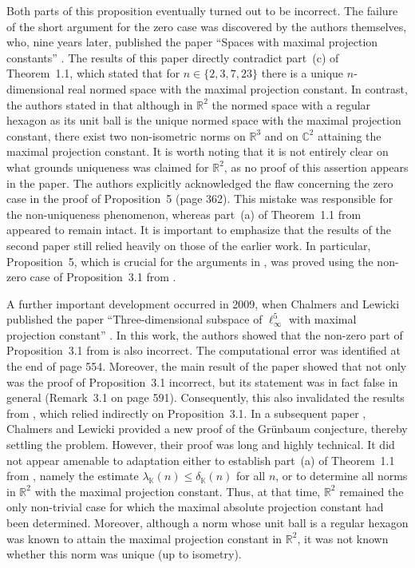 \documentclass[12pt, reqno]{amsart}
\theoremstyle{definition}
\theoremstyle{remark}
\numberwithin{equation}{section}
\begin{document}
Both parts of this proposition eventually turned out to be incorrect. The failure of the short argument for the zero case was discovered by the authors themselves, who, nine years later, published the paper ``Spaces with maximal projection constants'' \cite{konigtomczak2}. The results of this paper directly contradict part~(c) of Theorem~1.1, which stated that for $n \in \{2, 3, 7, 23\}$ there is a unique $n$-dimensional real normed space with the maximal projection constant. In contrast, the authors stated in \cite{konigtomczak2} that although in $\mathbb{R}^2$ the normed space with a regular hexagon as its unit ball is the unique normed space with the maximal projection constant, there exist two non-isometric norms on $\mathbb{R}^3$ and on $\mathbb{C}^2$ attaining the maximal projection constant. It is worth noting that it is not entirely clear on what grounds uniqueness was claimed for $\mathbb{R}^2$, as no proof of this assertion appears in the paper. The authors explicitly acknowledged the flaw concerning the zero case in the proof of Proposition~5 (page 362). This mistake was responsible for the non-uniqueness phenomenon, whereas part~(a) of Theorem~1.1 from \cite{konigtomczak} appeared to remain intact. It is important to emphasize that the results of the second paper \cite{konigtomczak2} still relied heavily on those of the earlier work. In particular, Proposition~5, which is crucial for the arguments in \cite{konigtomczak2}, was proved using the non-zero case of Proposition~3.1 from \cite{konigtomczak}.

A further important development occurred in 2009, when Chalmers and Lewicki published the paper ``Three-dimensional subspace of $\ell_{\infty}^5$ with maximal projection constant'' \cite{chalmerslewicki}. In this work, the authors showed that the non-zero part of Proposition~3.1 from \cite{konigtomczak} is also incorrect. The computational error was identified at the end of page 554. Moreover, the main result of the paper showed that not only was the proof of Proposition~3.1 incorrect, but its statement was in fact false in general (Remark~3.1 on page 591). Consequently, this also invalidated the results from \cite{konigtomczak2}, which relied indirectly on Proposition~3.1. In a subsequent paper \cite{chalmerslewicki2}, Chalmers and Lewicki provided a new proof of the Gr\"unbaum conjecture, thereby settling the problem. However, their proof was long and highly technical. It did not appear amenable to adaptation either to establish part~(a) of Theorem~1.1 from \cite{konigtomczak}, namely the estimate $\lambda_{\mathbb{K}}(n)\leq \delta_{\mathbb{K}}(n)$ for all $n$, or to determine all norms in $\mathbb{R}^2$ with the maximal projection constant. Thus, at that time, $\mathbb{R}^2$ remained the only non-trivial case for which the maximal absolute projection constant had been determined. Moreover, although a norm whose unit ball is a regular hexagon was known to attain the maximal projection constant in $\mathbb{R}^2$, it was not known whether this norm was unique (up to isometry).
\end{document}
